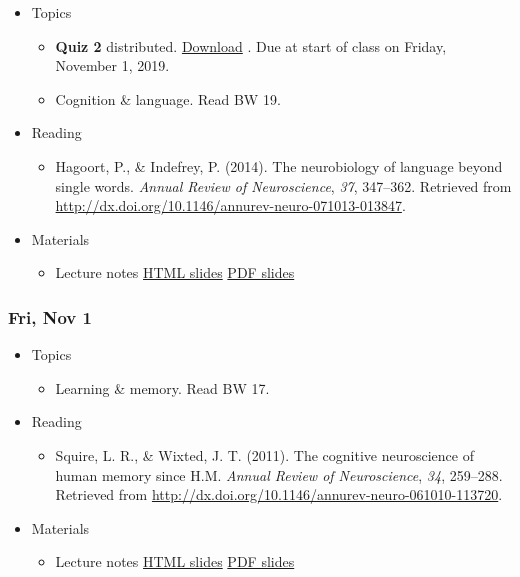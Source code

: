 \documentclass[]{article}
\providecommand{\tightlist}{%
  \setlength{\itemsep}{0pt}\setlength{\parskip}{0pt}}
\begin{document}
\begin{itemize}
\tightlist
\item
  Topics

  \begin{itemize}
  \tightlist
  \item
    \textbf{Quiz 2} distributed. \textbar{} \href{}{Download}
    \textbar{}. Due at start of class on Friday, November 1, 2019.
  \item
    Cognition \& language. Read BW 19.
  \end{itemize}
\item
  Reading

  \begin{itemize}
  \tightlist
  \item
    Hagoort, P., \& Indefrey, P. (2014). The neurobiology of language
    beyond single words. \emph{Annual Review of Neuroscience},
    \emph{37}, 347--362. Retrieved from
    \url{http://dx.doi.org/10.1146/annurev-neuro-071013-013847}.
  \end{itemize}
\item
  Materials

  \begin{itemize}
  \tightlist
  \item
    Lecture notes \textbar{} \href{}{HTML slides} \textbar{} \href{}{PDF
    slides}
  \end{itemize}
\end{itemize}

\hypertarget{fri-nov-1}{%
\subsubsection{Fri, Nov 1}\label{fri-nov-1}}

\begin{itemize}
\tightlist
\item
  Topics

  \begin{itemize}
  \tightlist
  \item
    Learning \& memory. Read BW 17.
  \end{itemize}
\item
  Reading

  \begin{itemize}
  \tightlist
  \item
    Squire, L. R., \& Wixted, J. T. (2011). The cognitive neuroscience
    of human memory since H.M. \emph{Annual Review of Neuroscience},
    \emph{34}, 259--288. Retrieved from
    \url{http://dx.doi.org/10.1146/annurev-neuro-061010-113720}.
  \end{itemize}
\item
  Materials

  \begin{itemize}
  \tightlist
  \item
    Lecture notes \textbar{} \href{}{HTML slides} \textbar{} \href{}{PDF
    slides}
  \end{itemize}
\end{itemize}
\end{document}
